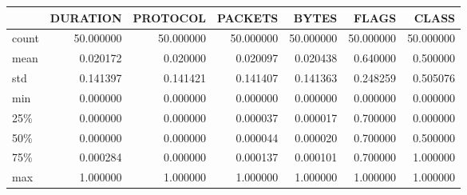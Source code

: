 \begin{tabular}{lrrrrrr}
\toprule
{} &   DURATION &   PROTOCOL &    PACKETS &      BYTES &      FLAGS &      CLASS \\
\midrule
count &  50.000000 &  50.000000 &  50.000000 &  50.000000 &  50.000000 &  50.000000 \\
mean  &   0.020172 &   0.020000 &   0.020097 &   0.020438 &   0.640000 &   0.500000 \\
std   &   0.141397 &   0.141421 &   0.141407 &   0.141363 &   0.248259 &   0.505076 \\
min   &   0.000000 &   0.000000 &   0.000000 &   0.000000 &   0.000000 &   0.000000 \\
25\%   &   0.000000 &   0.000000 &   0.000037 &   0.000017 &   0.700000 &   0.000000 \\
50\%   &   0.000000 &   0.000000 &   0.000044 &   0.000020 &   0.700000 &   0.500000 \\
75\%   &   0.000284 &   0.000000 &   0.000137 &   0.000101 &   0.700000 &   1.000000 \\
max   &   1.000000 &   1.000000 &   1.000000 &   1.000000 &   1.000000 &   1.000000 \\
\bottomrule
\end{tabular}
